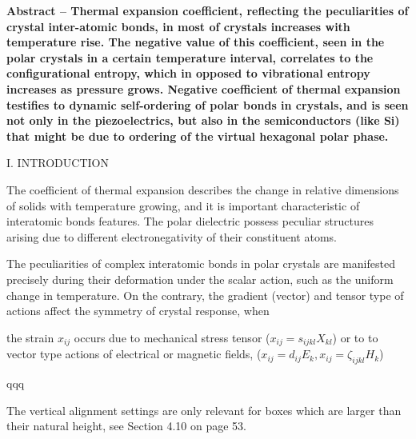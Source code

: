 \documentclass[a4paper, fontsize=12pt]{article}
\begin{document}
\noindent

\textbf{Abstract -- Thermal expansion coefficient, reflecting the peculiarities of crystal inter-atomic bonds, in most of crystals increases with temperature rise. The negative value of this coefficient, seen in the polar crystals in a certain temperature interval, correlates to the configurational entropy, which in opposed to vibrational entropy increases as pressure grows. Negative coefficient of thermal expansion testifies to dynamic self-ordering of polar bonds in crystals, and is seen not only in the piezoelectrics, but also in the semiconductors (like Si) that might be due to ordering of the virtual hexagonal polar phase.}


\vspace{0.5cm}

\begin{center}I. INTRODUCTION\end{center}
The coefficient of thermal expansion describes the change in relative dimensions of solids with temperature growing, and it is important characteristic of interatomic bonds features. The polar dielectric possess peculiar structures arising due to different electronegativity of their constituent atoms. 

The peculiarities of complex interatomic bonds in polar crystals are manifested
precisely during their deformation under the scalar action, such as the uniform
change in temperature. On the contrary, the gradient (vector) and tensor type of
actions affect the symmetry of crystal response, when

the strain $x_{ij}$ occurs due to mechanical stress tensor ($x_{ij} = s_{ijkl}X_{kl}$) 
or to to vector type actions of electrical or magnetic fields, ($x_{ij} = d_{ij}E_k, x_{ij}
= \zeta_{ijkl}H_{k}$)

qqq





\begin{caja}[title=warning]
The vertical alignment settings are only relevant for boxes which are larger than their natural height, see Section 4.10 on page 53.
\end{caja}
\end{document}
